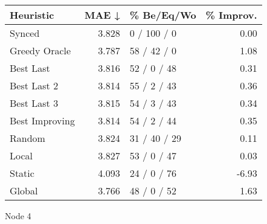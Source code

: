 \begin{tabular}{lrlr}
\toprule
\textbf{Heuristic} & \textbf{MAE ↓} & \textbf{\% Be/Eq/Wo} & \textbf{\% Improv.} \\
\midrule
            Synced &          3.828 &          0 / 100 / 0 &                0.00 \\
     Greedy Oracle &          3.787 &          58 / 42 / 0 &                1.08 \\
         Best Last &          3.816 &          52 / 0 / 48 &                0.31 \\
       Best Last 2 &          3.814 &          55 / 2 / 43 &                0.36 \\
       Best Last 3 &          3.815 &          54 / 3 / 43 &                0.34 \\
    Best Improving &          3.814 &          54 / 2 / 44 &                0.35 \\
            Random &          3.824 &         31 / 40 / 29 &                0.11 \\
             Local &          3.827 &          53 / 0 / 47 &                0.03 \\
            Static &          4.093 &          24 / 0 / 76 &               -6.93 \\
            Global &          3.766 &          48 / 0 / 52 &                1.63 \\
\bottomrule
\end{tabular}
\caption{Node 4}
\label{tab:ds_non_lr01_le2_bs2_4}
